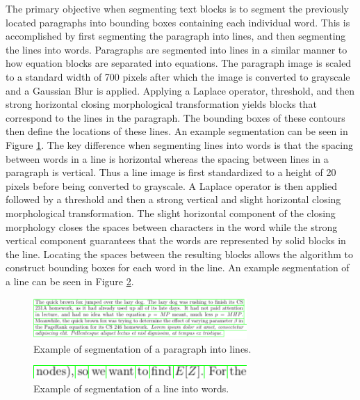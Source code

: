 \documentclass[10pt]{IEEEtran}
\begin{document}
The primary objective when segmenting text blocks is to segment the previously located paragraphs into bounding boxes containing each individual word. This is accomplished by first segmenting the paragraph into lines, and then segmenting the lines into words. Paragraphs are segmented into lines in a similar manner to how equation blocks are separated into equations. The paragraph image is scaled to a standard width of 700 pixels after which the image is converted to grayscale and a Gaussian Blur is applied. Applying a Laplace operator, threshold, and then strong horizontal closing morphological transformation yields blocks that correspond to the lines in the paragraph. The bounding boxes of these contours then define the locations of these lines. An example segmentation can be seen in Figure \ref{fig:paragraph1}. The key difference when segmenting lines into words is that the spacing between words in a line is horizontal whereas the spacing between lines in a paragraph is vertical. Thus a line image is first standardized to a height of 20 pixels before being converted to grayscale. A Laplace operator is then applied followed by a threshold and then a strong vertical and slight horizontal closing morphological transformation. The slight horizontal component of the closing morphology closes the spaces between characters in the word while the strong vertical component guarantees that the words are represented by solid blocks in the line. Locating the spaces between the resulting blocks allows the algorithm to construct bounding boxes for each word in the line. An example segmentation of a line can be seen in Figure \ref{fig:line1}.

\begin{figure}[h]
  \centering
    \includegraphics[width=3.2in]{paragraph2-bounds.png}
  \caption{Example of segmentation of a paragraph into lines.}
  \label{fig:paragraph1}
\end{figure}

\begin{figure}[h]
  \centering
    \includegraphics[width=3.2in]{line1.png}
  \caption{Example of segmentation of a line into words.}
  \label{fig:line1}
\end{figure}
\end{document}
